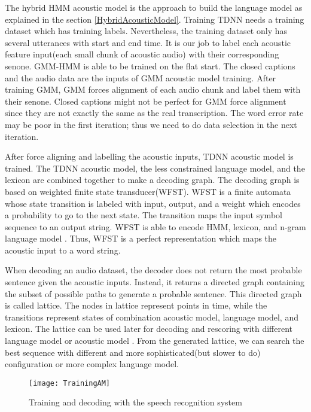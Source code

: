 The hybrid HMM acoustic model is the approach to build the language model as explained in the section \ref{HybridAcousticModel}. Training TDNN needs a training dataset which has training labels. Nevertheless, the training dataset only has several utterances with start and end time. It is our job to label each acoustic feature input(each small chunk of acoustic audio) with their corresponding senone. GMM-HMM is able to be trained  on  the flat start. The closed captions and the audio data are  the inputs of GMM acoustic model training. After training GMM, GMM forces alignment of each audio chunk and label them with their senone. Closed captions might not be perfect for GMM force alignment since they are not exactly the same as the real transcription.  The word error rate may be poor in the first iteration; thus we need to do data selection in the next iteration. 

After force aligning and labelling the acoustic inputs, TDNN acoustic model is trained. The TDNN acoustic model, the less constrained language model, and the lexicon are combined together to make a decoding graph. The decoding graph is based on weighted finite state transducer(WFST). WFST is a finite automata whose state transition is labeled with input, output, and a weight which encodes a probability to go to the next state. The transition maps the input symbol sequence to an output string. WFST is able to encode HMM, lexicon, and n-gram language model \cite{Mohri2008}. Thus, WFST is a perfect representation which maps the acoustic input to a word string. 

When decoding an audio dataset, the decoder does not return the most probable sentence given the acoustic inputs. Instead, it returns a directed graph containing the subset of possible paths to generate a probable sentence. This directed graph is called lattice. The nodes in lattice represent points in time, while the transitions represent states of combination acoustic model, language model, and lexicon. The lattice can be used later for decoding and rescoring with different language model or acoustic model \cite{Murveit1993}. From the generated lattice, we can search the best sequence with different and more sophisticated(but slower to do) configuration or more complex language model.


\begin{figure}[H]
\caption{Training and decoding with the speech recognition system}
\label{ASRchart}
\texttt{[image: TrainingAM]} 
\centering
\end{figure}

